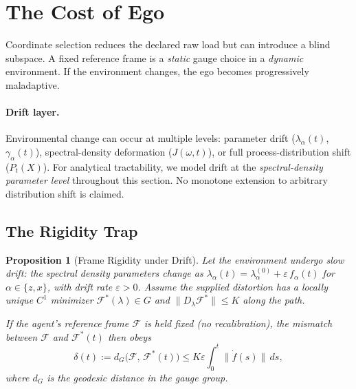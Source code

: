 \documentclass[12pt,a4paper,openany]{book}
\newtheorem{proposition}[theorem]{Proposition}
\begin{document}
\section{The Cost of Ego}
\label{II-sec:cost}

Coordinate selection reduces the declared raw load but can introduce a
blind subspace. A fixed reference frame is a \emph{static}
gauge choice in a \emph{dynamic} environment.
If the environment changes, the ego becomes progressively
maladaptive.

\paragraph{Drift layer.}
Environmental change can occur at multiple levels:
parameter drift ($\lambda_\alpha(t)$, $\gamma_\alpha(t)$),
spectral-density deformation ($J(\omega, t)$), or
full process-distribution shift ($P_t(X)$).
For analytical tractability, we model drift at the
\emph{spectral-density parameter level} throughout this
section.  No monotone extension to arbitrary distribution shift is
claimed.

\subsection{The Rigidity Trap}
\label{II-subsec:rigidity}

\begin{proposition}[Frame Rigidity under Drift]
\label{II-prop:rigidity}
Let the environment undergo slow drift: the spectral density
parameters change as
$\lambda_\alpha(t) = \lambda_\alpha^{(0)}
+ \varepsilon\,f_\alpha(t)$
for $\alpha \in \{z, x\}$, with drift rate
$\varepsilon > 0$.
Assume the supplied distortion has a locally unique $C^1$
minimizer $\mathcal{F}^*(\lambda)\in G$ and
$\lVert D_\lambda\mathcal F^*\rVert\leq K$ along the path.

If the agent's reference frame $\mathcal{F}$ is held fixed
(no recalibration), the mismatch between $\mathcal{F}$
and $\mathcal{F}^*(t)$ then obeys
\begin{equation}
\label{II-eq:mismatch}
\delta(t)
:= d_G\bigl(\mathcal{F},\, \mathcal{F}^*(t)\bigr)
\leq K\varepsilon \int_0^t \lVert\dot{f}(s)\rVert\,ds,
\end{equation}
where $d_G$ is the geodesic distance in the gauge group.
\end{proposition}
\end{document}
